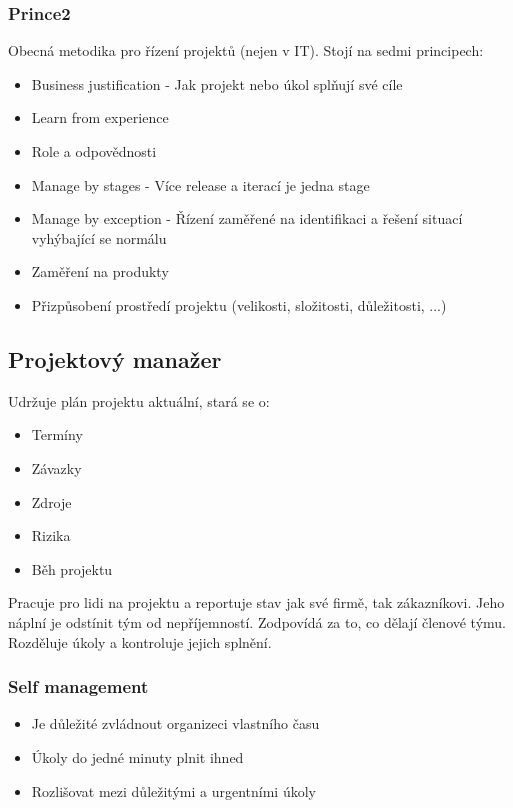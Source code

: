     \subsubsection{Prince2}
      Obecná metodika pro řízení projektů (nejen v IT). Stojí na sedmi principech:

      \begin{itemize}
        \item Business justification - Jak projekt nebo úkol splňují své cíle
        \item Learn from experience
        \item Role a odpovědnosti
        \item Manage by stages - Více release a iterací je jedna stage
        \item Manage by exception - Řízení zaměřené na identifikaci a řešení situací vyhýbající se normálu
        \item Zaměření na produkty
        \item Přizpůsobení prostředí projektu (velikosti, složitosti, důležitosti, ...)
      \end{itemize}

  \subsection{Projektový manažer}
    Udržuje plán projektu aktuální, stará se o:

    \begin{itemize}
      \item Termíny
      \item Závazky
      \item Zdroje
      \item Rizika
      \item Běh projektu
    \end{itemize}

    Pracuje pro lidi na projektu a reportuje stav jak své firmě, tak zákazníkovi.
    Jeho náplní je odstínit tým od nepříjemností. Zodpovídá za to, co dělají členové týmu.
    Rozděluje úkoly a kontroluje jejich splnění.

    \subsubsection{Self management}
      \begin{itemize}
        \item Je důležité zvládnout organizeci vlastního času
        \item Úkoly do jedné minuty plnit ihned
        \item Rozlišovat mezi důležitými a urgentními úkoly
      \end{itemize}

